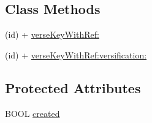 \subsection*{Class Methods}
\begin{DoxyCompactItemize}
\item 
(id) + \hyperlink{interface_sword_verse_key_a3b94b54cfd8d37ee1a2e655ceb053e52}{verse\-Key\-With\-Ref\-:}
\item 
(id) + \hyperlink{interface_sword_verse_key_ae588ca5123f85b40610148ce8c6dc7da}{verse\-Key\-With\-Ref\-:versification\-:}
\end{DoxyCompactItemize}
\subsection*{Protected Attributes}
\begin{DoxyCompactItemize}
\item 
B\-O\-O\-L \hyperlink{interface_sword_verse_key_ae652d20fc5dc8a8c3358805ceffc84c2}{created}
\end{DoxyCompactItemize}


